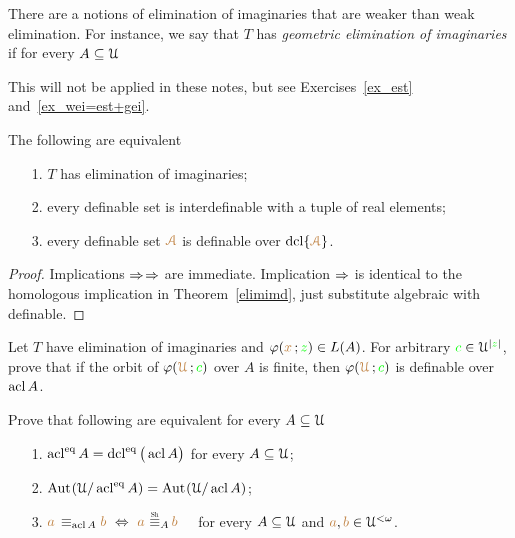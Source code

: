 \documentclass[creche.tex]{subfiles}
\begin{document}
There are a notions of elimination of imaginaries that are weaker than weak elimination.
For instance, we say that $T$ has \emph{geometric elimination of imaginaries\/} if for every $A\subseteq\EuScript U$

\ceq{\hfill{\acl}^\eq\{{\vl\Aa}\}}{=}{{\acl}^\eq\big(\acl\{{\vl\Aa}\}\big)}

This will not  be applied in these notes, but see Exercises~\ref{ex_est} and~\ref{ex_wei=est+gei}.

\begin{theorem}\label{elimimf} 
The following are equivalent
\begin{itemize}
\item[1.] $T$ has elimination of imaginaries;
\item[2.] every definable set is interdefinable with a tuple of real elements;
\item[3.] every definable set ${\color{brown}\EuScript A}$ is definable over $\mathop{\rm dcl}\{{\color{brown}\EuScript A}\}$.
\end{itemize}
\end{theorem}

\begin{proof}
Implications $\Rightarrow$$\Rightarrow$ are immediate.
Implication $\Rightarrow$ is identical to the homologous implication in Theorem~\ref{elimimd}, just substitute algebraic with definable.
\end{proof}



\begin{exercise}
  Let $T$ have elimination of imaginaries and $\varphi({\color{brown} x}\,;{\color{green} z})\in L(A)$.
  For arbitrary ${\color{green} c}\in\EuScript U^{|{\color{green} z}|}$, prove that if the orbit of $\varphi({\color{brown}\EuScript U}\,; {\color{green} c})$ over $A$ is finite, then $\varphi({\color{brown}\EuScript U}\,; {\color{green} c})$ is definable over $\mathop{\rm acl} A$.\QED
  \end{exercise}
  
  
  \begin{exercise}\label{ex_est}
    Prove that following are equivalent for every $A\subseteq\EuScript U$
    \begin{itemize}
    \item[1.]  $\mathop{\rm acl}^{{\rm eq}} A=\mathop{\rm dcl}^{{\rm eq}}\big(\mathop{\rm acl} A\big)$ for every $A\subseteq\EuScript U$;
    \item[2.]  ${\rm Aut\kern.15ex}(\EuScript U/\mathop{\rm acl}^{{\rm eq}} A)= {\rm Aut\kern.15ex}(\EuScript U/\mathop{\rm acl} A)$;
    \item[3.] ${\mr a}\,\equiv_{\acl A}{\mr b}\ \IFF\ {\mr a}\ \smash{\equivSh_A}\, {\mr b}$ \ \ for every $A\subseteq\EuScript U$ and  ${\color{brown} a},{\color{brown} b}\in\EuScript U^{<\omega}$.\QED
    \end{itemize} 
  \end{exercise}
  
\end{document}
